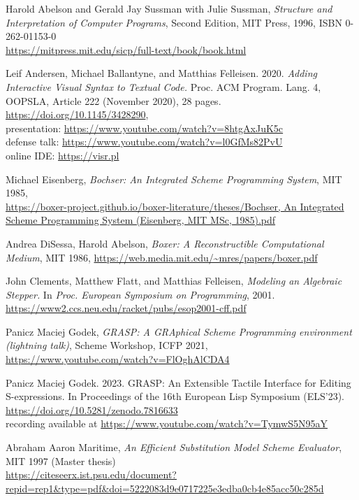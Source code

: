 \documentclass[acmsmall]{acmart}
\begin{document}
\begin{thebibliography}{12}

  Harold Abelson and Gerald Jay Sussman with Julie Sussman,
  \emph{Structure and Interpretation of Computer Programs},
  Second Edition, MIT Press, 1996, ISBN 0-262-01153-0 \\
  \url{https://mitpress.mit.edu/sicp/full-text/book/book.html}
  
  Leif Andersen, Michael Ballantyne, and Matthias
  Felleisen. 2020. \emph{Adding Interactive Visual Syntax to Textual
  Code.} Proc. ACM Program. Lang. 4, OOPSLA, Article 222 (November
  2020), 28 pages. \url{https://doi.org/10.1145/3428290}, \\
  presentation: \url{https://www.youtube.com/watch?v=8htgAxJuK5c} \\ 
  defense talk: \url{https://www.youtube.com/watch?v=l0GfMs82PvU} \\
  online IDE: \url{https://visr.pl}

Michael Eisenberg, \emph{Bochser: An Integrated Scheme Programming System},
  MIT 1985, \\
  \url{https://boxer-project.github.io/boxer-literature/theses/Bochser, An Integrated Scheme Programming System (Eisenberg, MIT MSc, 1985).pdf}
  
  Andrea DiSessa, Harold Abelson,
  \emph{Boxer: A Reconstructible Computational Medium},
  MIT 1986, \url{https://web.media.mit.edu/~mres/papers/boxer.pdf}

  John Clements, Matthew Flatt, and Matthias Felleisen,
  \emph{Modeling an Algebraic Stepper.} In \emph{Proc. European
  Symposium on Programming}, 2001. \\
  \url{https://www2.ccs.neu.edu/racket/pubs/esop2001-cff.pdf}
  
 Panicz Maciej Godek, \emph{GRASP: A GRAphical
Scheme Programming environment (lightning talk)}, Scheme Workshop,
  ICFP 2021, \url{https://www.youtube.com/watch?v=FlOghAlCDA4}

 Panicz Maciej Godek. 2023. GRASP: An Extensible
  Tactile Interface for Editing S-expressions. In Proceedings of the
  16th European Lisp Symposium (ELS’23). 
  \url{https://doi.org/10.5281/zenodo.7816633} \\ recording
  available at \url{https://www.youtube.com/watch?v=TymwS5N95aY}

 Abraham Aaron Maritime, \emph{An Efficient
Substitution Model Scheme Evaluator}, MIT 1997 (Master thesis)\\
  \url{https://citeseerx.ist.psu.edu/document?repid=rep1&type=pdf&doi=5222083d9e0717225e3edba0cb4e85acc50c285d}


\end{thebibliography}
\end{document}
